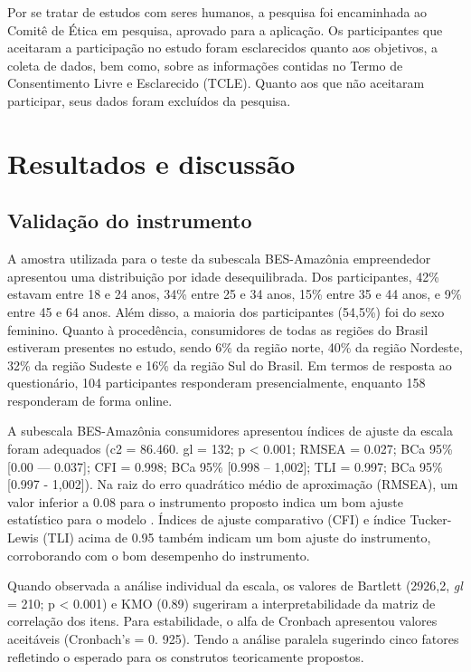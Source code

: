 Por se tratar de estudos com seres humanos, a pesquisa foi encaminhada ao Comitê de Ética em pesquisa, aprovado para a aplicação. Os participantes que aceitaram a participação no estudo foram esclarecidos quanto aos objetivos, a coleta de dados, bem como, sobre as informações contidas no Termo de Consentimento Livre e Esclarecido (TCLE). Quanto aos que não aceitaram participar, seus dados foram excluídos da pesquisa.


\section{Resultados e discussão}

\subsection{Validação do instrumento}

A amostra utilizada para o teste da subescala BES-Amazônia empreendedor apresentou uma distribuição por idade desequilibrada. Dos participantes, 42\% estavam entre 18 e 24 anos, 34\% entre 25 e 34 anos, 15\% entre 35 e 44 anos, e 9\% entre 45 e 64 anos. Além disso, a maioria dos participantes (54,5\%) foi do sexo feminino. Quanto à procedência, consumidores de todas as regiões do Brasil estiveram presentes no estudo, sendo 6\% da região norte, 40\% da região Nordeste, 32\% da região Sudeste e 16\% da região Sul do Brasil. Em termos de resposta ao questionário, 104 participantes responderam presencialmente, enquanto 158 responderam de forma online.

A subescala BES-Amazônia consumidores apresentou índices de ajuste da escala foram adequados (c2 = 86.460. gl = 132; p < 0.001; RMSEA = 0.027; BCa 95\% [0.00 — 0.037]; CFI = 0.998; BCa 95\% [0.998 – 1,002]; TLI = 0.997; BCa 95\% [0.997 - 1,002]). Na raiz do erro quadrático médio de aproximação (RMSEA), um valor inferior a 0.08 para o instrumento proposto indica um bom ajuste estatístico para o modelo \cite{West2012ModelModelingb,Tucker1973AAnalysisb}. Índices de ajuste comparativo (CFI) e índice Tucker-Lewis (TLI) acima de 0.95 também indicam um bom ajuste do instrumento, corroborando com o bom desempenho do instrumento.

Quando observada a análise individual da escala, os valores de Bartlett (2926,2, \textit{gl} = 210; p < 0.001) e KMO (0.89) sugeriram a interpretabilidade da matriz de correlação dos itens. Para estabilidade, o alfa de Cronbach apresentou valores aceitáveis (Cronbach's = 0. 925). Tendo a análise paralela sugerindo cinco fatores refletindo o esperado para os construtos teoricamente propostos. 

